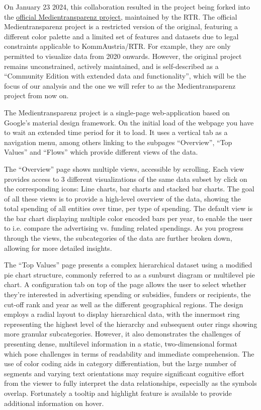 \documentclass{vgtc}                          %
\begin{document}
On January 23 2024, this collaboration resulted in the project being forked into the \href{https://visualisierung.medientransparenz.rtr.at/home}{official Medientransparenz project}, maintained by the RTR. The official Medientransparenz project is a restricted version of the original, featuring a different color palette and a limited set of features and datasets due to legal constraints applicable to KommAustria/RTR. For example, they are only permitted to visualize data from 2020 onwards. However, the original project remains unconstrained, actively maintained, and is self-described as a ``Community Edition with extended data and functionality'', which will be the focus of our analysis and the one we will refer to as the Medientransparenz project from now on.

The Medientransparenz project is a single-page web-application based on Google's material design framework. On the initial load of the webpage you have to wait an extended time period for it to load. It uses a vertical tab as a navigation menu, among others linking to the subpages ``Overview'', ``Top Values'' and ``Flows'' which provide different views of the data.

The ``Overview'' page shows multiple views, accessible by scrolling. Each view provides access to 3 different visualizations of the same data subset by click on the corresponding icons: Line charts, bar charts and stacked bar charts. The goal of all these views is to provide a high-level overview of the data, showing the total spending of all entities over time, per type of spending. The default view is the bar chart displaying multiple color encoded bars per year, to enable the user to i.e. compare the advertising vs. funding related spendings. As you progress through the views, the subcategories of the data are further broken down, allowing for more detailed insights. 

The ``Top Values'' page presents a complex hierarchical dataset using a modified pie chart structure, commonly referred to as a sunburst diagram or multilevel pie chart. A configuration tab on top of the page allows the user to select whether they're interested in advertising spending or subsidies, funders or recipients, the cut-off rank and year as well as the different geographical regions.
The design employs a radial layout to display hierarchical data, with the innermost ring representing the highest level of the hierarchy and subsequent outer rings showing more granular subcategories. However, it also demonstrates the challenges of presenting dense, multilevel information in a static, two-dimensional format which pose challenges in terms of readability and immediate comprehension. The use of color coding aids in category differentiation, but the large number of segments and varying text orientations may require significant cognitive effort from the viewer to fully interpret the data relationships, especially as the symbols overlap. Fortunately a tooltip and highlight feature is available to provide additional information on hover.
\end{document}
